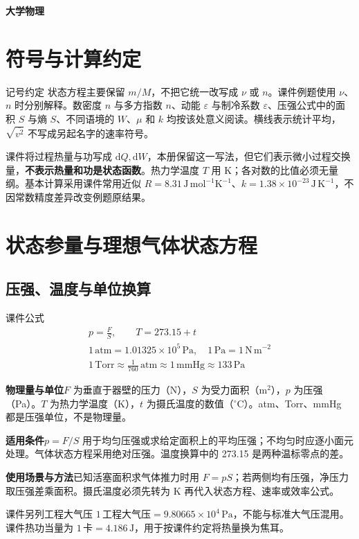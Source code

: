\documentclass[UTF8,fontset=none,zihao=-4,a4paper]{ctexart}
\newcommand{\chapterpage}[1]{\clearpage\section{#1}}
\newcommand{\unit}[1]{\,\mathrm{#1}}
\newcommand{\explain}[3]{\par\noindent\textbf{物理量与单位}\quad #1\par
\noindent\textbf{适用条件}\quad #2\par
\noindent\textbf{使用场景与方法}\quad #3\par}
\begin{document}
\begin{titlepage}\thispagestyle{empty}\vspace*{0.28\textheight}
\begin{center}{\fontsize{36}{45}\selectfont\bfseries 大学物理}\end{center}\end{titlepage}
\tableofcontents\clearpage{}
\chapterpage{符号与计算约定}
\begin{infobox}{记号约定}
状态方程主要保留 $m/M$，不把它统一改写成 $\nu$ 或 $n$。课件例题使用 $\nu$、$n$ 时分别解释。数密度 $n$ 与多方指数 $n$、动能 $\varepsilon$ 与制冷系数 $\varepsilon$、压强公式中的面积 $S$ 与熵 $S$、不同语境的 $W$、$\mu$ 和 $k$ 均按该处意义阅读。横线表示统计平均，$\sqrt{\overline{v^2}}$ 不写成另起名字的速率符号。
\end{infobox}
课件将过程热量与功写成 $\mathrm dQ,\mathrm dW$，本册保留这一写法，但它们表示微小过程交换量，\textbf{不表示热量和功是状态函数}。热力学温度 $T$ 用 K；各对数的比值必须无量纲。基本计算采用课件常用近似 $R=8.31\unit{J\,mol^{-1}K^{-1}}$、$k=1.38\times10^{-23}\unit{J\,K^{-1}}$，不因常数精度差异改变例题原结果。

\chapterpage{状态参量与理想气体状态方程}
\par\noindent\begin{minipage}{\linewidth}
\subsection{压强、温度与单位换算}
\begin{infobox}[breakable=false]{课件公式}
\begin{gather*}p=\frac FS,\qquad T=273.15+t\\1\unit{atm}=1.01325\times10^5\unit{Pa},\quad1\unit{Pa}=1\unit{N\,m^{-2}}\\1\unit{Torr}\approx\frac1{760}\unit{atm}\approx1\unit{mmHg}\approx133\unit{Pa}\end{gather*}
\end{infobox}
\end{minipage}\par
\explain{$F$ 为垂直于器壁的压力（N），$S$ 为受力面积（$\mathrm m^2$），$p$ 为压强（Pa）。$T$ 为热力学温度（K），$t$ 为摄氏温度的数值（$^\circ\mathrm C$）。atm、Torr、mmHg 都是压强单位，不是物理量。}{$p=F/S$ 用于均匀压强或求给定面积上的平均压强；不均匀时应逐小面元处理。气体状态方程采用绝对压强。温度换算中的 273.15 是两种温标零点的差。}{已知活塞面积求气体推力时用 $F=pS$；若两侧均有压强，净压力取压强差乘面积。摄氏温度必须先转为 K 再代入状态方程、速率或效率公式。}
课件另列工程大气压 $1\,\text{工程大气压}=9.80665\times10^4\unit{Pa}$，不能与标准大气压混用。课件热功当量为 $1\,\text{卡}=4.186\unit J$，用于按课件约定将热量换为焦耳。
\end{document}
